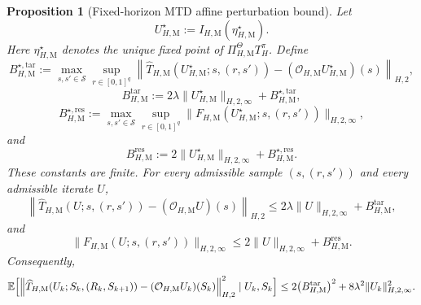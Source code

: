 \documentclass{article}
\newtheorem{proposition}[theorem]{Proposition}
\newcommand{\X}{\mathcal{S}}
\begin{document}
\begin{proposition}[Fixed-horizon MTD affine perturbation bound]
\label{prop:fh-mtd-perturb}
Let
\begin{equation}
U^\star_{H,\mathrm M} := I_{H,\mathrm M}(\eta_{H,\mathrm M}^\star).
\end{equation}
Here $\eta_{H,\mathrm M}^\star$ denotes the unique fixed point of $\Pi_{H,\mathrm M}^{\Theta}T_H^\pi$. Define
\begin{equation}
B^{\star,\mathrm{tar}}_{H,\mathrm M}:=\max_{s,s'\in\X}\sup_{r\in[0,1]^q}\left\lVert\widehat T_{H,\mathrm M}(U^\star_{H,\mathrm M};s,(r,s'))-(\mathcal O_{H,\mathrm M}U^\star_{H,\mathrm M})(s)\right\rVert_{H,2},
\end{equation}
\begin{equation}
B^{\mathrm{tar}}_{H,\mathrm M}:=2\lambda\lVert U^\star_{H,\mathrm M}\rVert_{H,2,\infty}+B^{\star,\mathrm{tar}}_{H,\mathrm M},
\end{equation}
\begin{equation}
B^{\star,\mathrm{res}}_{H,\mathrm M}:=\max_{s,s'\in\X}\sup_{r\in[0,1]^q}\lVert F_{H,\mathrm M}(U^\star_{H,\mathrm M};s,(r,s'))\rVert_{H,2,\infty},
\end{equation}
and
\begin{equation}
B^{\mathrm{res}}_{H,\mathrm M}:=2\lVert U^\star_{H,\mathrm M}\rVert_{H,2,\infty}+B^{\star,\mathrm{res}}_{H,\mathrm M}.
\end{equation}
These constants are finite. For every admissible sample $(s,(r,s'))$ and every admissible iterate $U$,
\begin{equation}
\left\lVert \widehat T_{H,\mathrm M}(U; s, (r,s')) - (\mathcal O_{H,\mathrm M}U)(s) \right\rVert_{H,2} \le 2 \lambda \lVert U \rVert_{H,2,\infty} + B^{\mathrm{tar}}_{H,\mathrm M},
\end{equation}
and
\begin{equation}
\lVert F_{H,\mathrm M}(U; s, (r,s')) \rVert_{H,2,\infty} \le 2 \lVert U \rVert_{H,2,\infty} + B^{\mathrm{res}}_{H,\mathrm M}.
\end{equation}
Consequently,
\begin{equation}
\mathbb E \Bigl[ \left\lVert \widehat T_{H,\mathrm M}(U_k; S_k, (R_k,S_{k+1})) - (\mathcal O_{H,\mathrm M}U_k)(S_k) \right\rVert_{H,2}^2 \mid U_k, S_k \Bigr] \le 2 \bigl(B^{\mathrm{tar}}_{H,\mathrm M}\bigr)^2 + 8 \lambda^2 \lVert U_k \rVert_{H,2,\infty}^2.
\end{equation}
\end{proposition}
\end{document}
